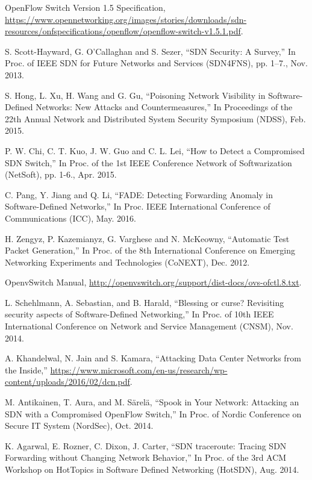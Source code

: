\documentclass[conference]{IEEEtran}
\begin{document}
\begin{thebibliography}{1}

OpenFlow Switch Version 1.5 Specification, \url{https://www.opennetworking.org/images/stories/downloads/sdn-resources/onfspecifications/openflow/openflow-switch-v1.5.1.pdf}.

S. Scott-Hayward, G. O’Callaghan and S. Sezer,
``SDN Security: A Survey,'' In Proc. of IEEE SDN for Future Networks and Services (SDN4FNS), pp. 1–7., Nov. 2013.

S. Hong, L. Xu, H. Wang and G. Gu,
``Poisoning Network Visibility in Software-Defined Networks: New Attacks and Countermeasures,''  In Proceedings of the 22th Annual Network and Distributed System Security Symposium (NDSS), Feb. 2015.

P. W. Chi, C. T. Kuo, J. W. Guo and C. L. Lei,
``How to Detect a Compromised SDN Switch,'' In Proc. of the 1st IEEE Conference Network of Softwarization (NetSoft), pp. 1-6., Apr. 2015.

C. Pang, Y. Jiang and Q. Li,
``FADE: Detecting Forwarding Anomaly in Software-Defined Networks,'' In Proc. IEEE International Conference of Communications (ICC), May. 2016.

H. Zengyz, P. Kazemianyz, G. Varghese and N. McKeowny,
``Automatic Test Packet Generation,'' In Proc. of the 8th International Conference on Emerging Networking Experiments and Technologies (CoNEXT), Dec. 2012.

OpenvSwitch Manual, \url{http://openvswitch.org/support/dist-docs/ovs-ofctl.8.txt}.

L. Schehlmann, A. Sebastian, and B. Harald, 
``Blessing or curse? Revisiting security aspects of Software-Defined Networking,'' In Proc. of 10th IEEE International Conference on Network and Service Management (CNSM), Nov. 2014.

A. Khandelwal, N. Jain and S. Kamara,
``Attacking Data Center Networks from the Inside,'' \url{https://www.microsoft.com/en-us/research/wp-content/uploads/2016/02/dcn.pdf}.
 
M. Antikainen, T. Aura, and M. Särelä,
``Spook in Your Network: Attacking an SDN with a Compromised OpenFlow Switch,'' In Proc. of Nordic Conference on Secure IT System (NordSec), Oct. 2014.

K. Agarwal, E. Rozner, C. Dixon, J. Carter,
``SDN traceroute: Tracing SDN Forwarding without Changing Network Behavior,'' In Proc. of the 3rd ACM Workshop on HotTopics in Software Defined Networking (HotSDN), Aug. 2014.


\end{thebibliography}
\end{document}
